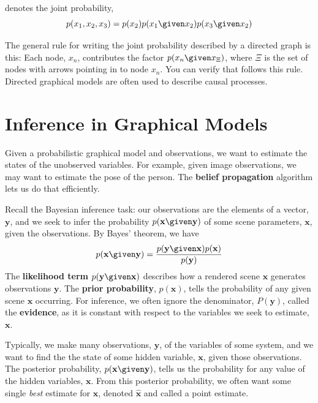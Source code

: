\noindent denotes the joint probability, 
\begin{equation}
p(x_1, x_2, x_3) = p(x_2)  p(x_1 \given x_2) p(x_3 \given x_2) 
\label{eq:directedjoint}
\end{equation}

The general rule for writing the joint probability described by a
directed graph is this:  Each node, $x_n$, contributes the factor
$p(x_n \given x_{\Xi})$, where $\Xi$ is the set of nodes with arrows pointing
in to node $x_n$.  You can verify that \eqn{\ref{eq:directedjoint}}
follows this rule.  Directed graphical models are often used to describe causal processes.

\section{Inference in Graphical Models}

Given a probabilistic graphical model and observations, we want to estimate the states of 
the unobserved variables. For example, given image
observations, we may want to estimate the pose of the person.
The {\bf belief propagation} algorithm lets us do that efficiently.

Recall the Bayesian inference task:  our observations are the
elements of a vector, $\mathbf{y}$, and we seek to infer the probability
$p(\mathbf{x} \given \mathbf{y})$ of some scene
parameters, $\mathbf{x}$, given the observations. 
By Bayes' theorem, we have
\begin{equation}
p(\mathbf{x} \given \mathbf{y}) = \frac{p(\mathbf{y} \given \mathbf{x}) p(\mathbf{x}) }{p(\mathbf{y}) }
\end{equation}
The {\bf likelihood term} 
$p(\mathbf{y} \given \mathbf{x})$ describes how a
rendered scene $\mathbf{x}$ generates observations $\mathbf{y}$.  The {\bf
prior probability}, 
$p(\mathbf{x})$, tells the probability of any given
scene $\mathbf{x}$ occurring.  For inference, we often ignore the denominator,
$P(\mathbf{y})$, called the {\bf evidence}, as it is constant with
respect to the variables we seek to estimate, $\mathbf{x}$.


Typically, we make many observations, $\mathbf{y}$, of the variables of some system,
and we want to find the the state of some hidden variable, $\mathbf{x}$, given those
observations.  The posterior probability, $p(\mathbf{x} \given \mathbf{y})$, tells
us the probability for any value of the hidden variables, $\mathbf{x}$.
From this posterior probability, we often want some single {\em best} estimate for $\mathbf{x}$,
denoted $\mathbf{\hat{x}}$ and called a point estimate.  

